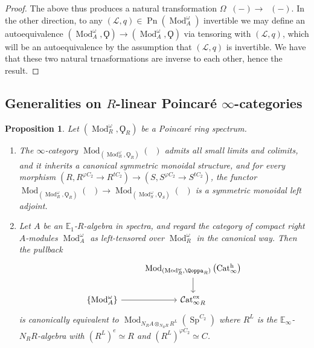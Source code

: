 \documentclass{article}
\DeclareMathOperator{\Brp}{Br^p} %
\DeclareMathOperator{\Cat}{\mathcal{C}at} %
\DeclareMathOperator{\Catex}{\Cat_\infty^{ex}} %
\DeclareMathOperator{\Cath}{Cat^h_\infty} %
\DeclareMathOperator{\Catpidem}{Cat^p_{\infty, idem}} %
\DeclareMathOperator{\Mod}{Mod} %
\DeclareMathOperator{\Picp}{Pic^p} %
\DeclareMathOperator{\Pn}{Pn} %
\DeclareMathOperator{\Spectra}{Sp} %
\newcommand{\EE}{\mathbb{E}}
\newtheorem{proposition}[equation]{Proposition}
\theoremstyle{definition}
\begin{document}
\begin{proof}
    The above thus produces a natural transformation $\Omega \Brp(-)\to \Picp(-)$. In the other direction, to any $(\mathcal{L},q)\in \Pn(\Mod_{A}^\omega)$ invertible we may define an autoequivalence $(\Mod_A^\omega,\Qoppa)\to (\Mod_A^\omega,\Qoppa)$ via tensoring with $(\mathcal{L},q)$, which will be an autoequivalence by the assumption that $(\mathcal{L},q)$ is invertible. We have that these two natural trnasformations are inverse to each other, hence the result.
\end{proof}

\subsection{Generalities on $R$-linear Poincar\'e \texorpdfstring{$\infty$}{∞}-categories}
\begin{proposition}\label{prop:relative_poincare_cats_basic_properties}
    Let $ (\Mod_R^\omega, \Qoppa_R) $ be a Poincaré ring spectrum. 
    \begin{enumerate}[label=(\arabic*)]
        \item \label{propitem:Rlin_Poincare_cats_is_symm_mon} The $ \infty $-category $ \Mod_{\left(\Mod_R^\omega, \Qoppa_R \right)}(\Catpidem) $ admits all small limits and colimits, and it inherits a canonical symmetric monoidal structure, and for every morphism $ \left(R, R^{\varphi C_2} \to R^{tC_2}\right) \to (S, S^{\varphi C_2} \to S^{tC_2}) $, the functor $ \Mod_{\left(\Mod_R^\omega, \Qoppa_R \right)}(\Catpidem) \to \Mod_{\left(\Mod_S^\omega, \Qoppa_S \right)}(\Catpidem) $ is a symmetric monoidal left adjoint. 
        \item \label{propitem:classify_R_lin_hermitian_struct} Let $ A $ be an $ \EE_1 $-$ R $-algebra in spectra, and regard the category of compact right $ A $-modules $ \Mod_A^\omega $ as left-tensored over $ \Mod_R^\omega $ in the canonical way. 
        Then the pullback
        \begin{equation}
        \begin{tikzcd}
            & \Mod_{(\Mod_R^\omega, \Qoppa_R)}\left(\Cath\right) \ar[d] \\
            \{\Mod_A^\omega\} \ar[r] & \Catex_R
        \end{tikzcd}
        \end{equation}
        is canonically equivalent to $ \Mod_{N_R A \otimes_{N_R R} R^L }\left(\Spectra^{C_2}\right) $ where $ R^L $ is the $ \EE_\infty $-$ N_R R $-algebra with $ (R^L)^e \simeq R $ and $ (R^L)^{\varphi C_2}  \simeq C $. 


\end{enumerate}
\end{proposition}
\end{document}
